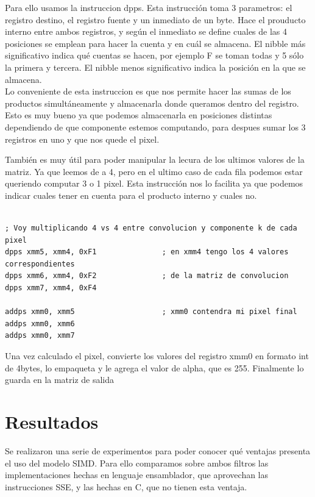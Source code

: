 \documentclass[10pt,a4paper,spanish]{article}
\begin{document}
Para ello usamos la instruccion dpps. Esta instrucción toma 3 parametros: el registro destino, el registro fuente y un inmediato de un byte. Hace el prouducto interno entre ambos registros, y según el inmediato se define cuales de las 4 posiciones se emplean para hacer la cuenta y en cuál se almacena. El nibble más significativo indica qué cuentas se hacen, por ejemplo F se toman todas y 5 sólo la primera y tercera. El nibble menos significativo indica la posición en la que se almacena. \\

Lo conveniente de esta instruccion es que nos permite hacer las sumas de los productos simultáneamente y almacenarla donde queramos dentro del registro. Esto es muy bueno ya que podemos almacenarla en posiciones distintas dependiendo de que componente estemos computando, para despues sumar los 3 registros en uno y que nos quede el pixel.

También es muy útil para poder manipular la lecura de los ultimos valores de la matriz. Ya que leemos de a 4, pero en el ultimo caso de cada fila podemos estar queriendo computar 3 o 1 pixel. Esta instrucción nos lo facilita ya que podemos indicar cuales tener en cuenta para el producto interno y cuales no. \\

\begin{codesnippet}
\begin{verbatim}

; Voy multiplicando 4 vs 4 entre convolucion y componente k de cada pixel
dpps xmm5, xmm4, 0xF1               ; en xmm4 tengo los 4 valores correspondientes
dpps xmm6, xmm4, 0xF2               ; de la matriz de convolucion
dpps xmm7, xmm4, 0xF4

addps xmm0, xmm5                    ; xmm0 contendra mi pixel final
addps xmm0, xmm6
addps xmm0, xmm7

\end{verbatim}
\end{codesnippet}

Una vez calculado el pixel, convierte los valores del registro xmm0 en formato int de 4bytes, lo empaqueta y le agrega el valor de alpha, que es 255. Finalmente lo guarda en la matriz de salida

\section{Resultados}

Se realizaron una serie de experimentos para poder conocer qué ventajas presenta el uso del modelo SIMD. Para ello comparamos sobre ambos filtros las implementaciones hechas en lenguaje ensamblador, que aprovechan las instrucciones SSE, y las hechas en C, que no tienen esta ventaja. \\
\end{document}
